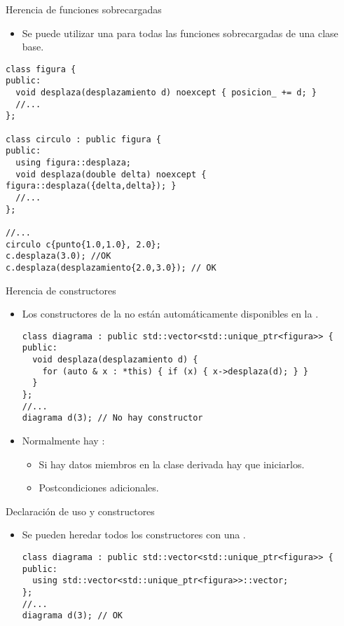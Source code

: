 \begin{frame}[t,fragile]{Herencia de funciones sobrecargadas}
\begin{itemize}
  \item Se puede utilizar una  para 
        todas las funciones sobrecargadas de una clase base.

\end{itemize}

\begin{lstlisting}
class figura {
public:
  void desplaza(desplazamiento d) noexcept { posicion_ += d; }
  //...
};

class circulo : public figura {
public:
  using figura::desplaza;
  void desplaza(double delta) noexcept { figura::desplaza({delta,delta}); }
  //...
};

//...
circulo c{punto{1.0,1.0}, 2.0};
c.desplaza(3.0); //OK
c.desplaza(desplazamiento{2.0,3.0}); // OK
\end{lstlisting}
\end{frame}

\begin{frame}[t,fragile]{Herencia de constructores}
\begin{itemize}
  \item Los constructores de la  no están automáticamente
        disponibles en la .

\begin{lstlisting}
class diagrama : public std::vector<std::unique_ptr<figura>> {
public:
  void desplaza(desplazamiento d) {
    for (auto & x : *this) { if (x) { x->desplaza(d); } }
  }
};
//...
diagrama d(3); // No hay constructor
\end{lstlisting}

  \item Normalmente hay :
    \begin{itemize}
      \item Si hay datos miembros en la clase derivada hay que iniciarlos.
      \item Postcondiciones adicionales.
    \end{itemize}

\end{itemize}
\end{frame}

\begin{frame}[t,fragile]{Declaración de uso y constructores}
\begin{itemize}
  \item Se pueden heredar todos los constructores con una .
\begin{lstlisting}
class diagrama : public std::vector<std::unique_ptr<figura>> {
public:
  using std::vector<std::unique_ptr<figura>>::vector; 
};
//...
diagrama d(3); // OK
\end{lstlisting}
\end{itemize}
\end{frame}

